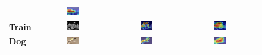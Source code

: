\begin{figure}[ht]
\begin{tcolorbox}[colframe=black!60, colback=white, boxrule=0.8pt, arc=2pt, left=2pt, right=2pt, top=2pt, bottom=2pt]
\begin{tabular}{m{2.5cm} c c c}
    & \includegraphics[width=0.18\textwidth,height=0.18\textwidth]{figures/test_cams/ours/2007_000033_0}
    \\
    \textbf{Train}
    & \includegraphics[width=0.18\textwidth,height=0.18\textwidth]{figures/originals/2007_000123}
    & \includegraphics[width=0.18\textwidth,height=0.18\textwidth]{figures/test_cams/weclip/2007_000123_18}
    & \includegraphics[width=0.18\textwidth,height=0.18\textwidth]{figures/test_cams/ours/2007_000123_18}
    \\
    \textbf{Dog}
    & \includegraphics[width=0.18\textwidth,height=0.18\textwidth]{figures/originals/2007_003194}
    & \includegraphics[width=0.18\textwidth,height=0.18\textwidth]{figures/test_cams/weclip/2007_003194_11}
    & \includegraphics[width=0.18\textwidth,height=0.18\textwidth]{figures/test_cams/ours/2007_003194_11}

\end{tabular}
\end{tcolorbox}
\end{figure}
